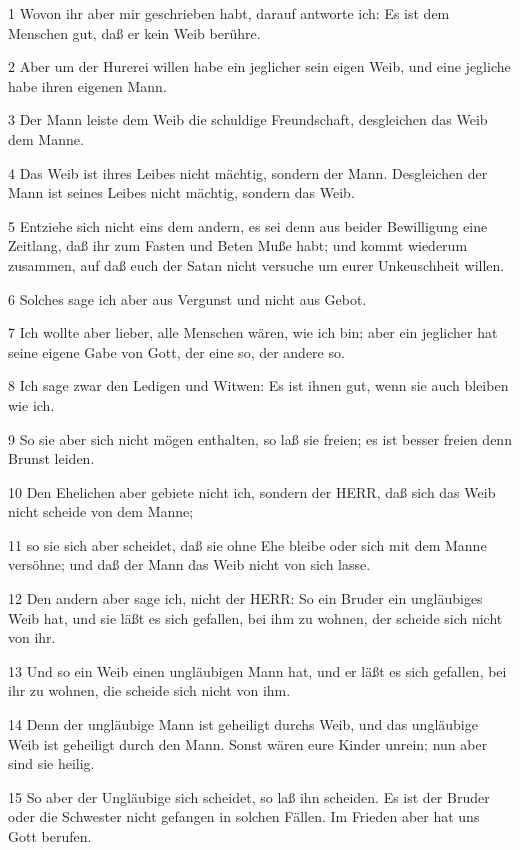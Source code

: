 \par 1 Wovon ihr aber mir geschrieben habt, darauf antworte ich: Es ist dem Menschen gut, daß er kein Weib berühre.
\par 2 Aber um der Hurerei willen habe ein jeglicher sein eigen Weib, und eine jegliche habe ihren eigenen Mann.
\par 3 Der Mann leiste dem Weib die schuldige Freundschaft, desgleichen das Weib dem Manne.
\par 4 Das Weib ist ihres Leibes nicht mächtig, sondern der Mann. Desgleichen der Mann ist seines Leibes nicht mächtig, sondern das Weib.
\par 5 Entziehe sich nicht eins dem andern, es sei denn aus beider Bewilligung eine Zeitlang, daß ihr zum Fasten und Beten Muße habt; und kommt wiederum zusammen, auf daß euch der Satan nicht versuche um eurer Unkeuschheit willen.
\par 6 Solches sage ich aber aus Vergunst und nicht aus Gebot.
\par 7 Ich wollte aber lieber, alle Menschen wären, wie ich bin; aber ein jeglicher hat seine eigene Gabe von Gott, der eine so, der andere so.
\par 8 Ich sage zwar den Ledigen und Witwen: Es ist ihnen gut, wenn sie auch bleiben wie ich.
\par 9 So sie aber sich nicht mögen enthalten, so laß sie freien; es ist besser freien denn Brunst leiden.
\par 10 Den Ehelichen aber gebiete nicht ich, sondern der HERR, daß sich das Weib nicht scheide von dem Manne;
\par 11 so sie sich aber scheidet, daß sie ohne Ehe bleibe oder sich mit dem Manne versöhne; und daß der Mann das Weib nicht von sich lasse.
\par 12 Den andern aber sage ich, nicht der HERR: So ein Bruder ein ungläubiges Weib hat, und sie läßt es sich gefallen, bei ihm zu wohnen, der scheide sich nicht von ihr.
\par 13 Und so ein Weib einen ungläubigen Mann hat, und er läßt es sich gefallen, bei ihr zu wohnen, die scheide sich nicht von ihm.
\par 14 Denn der ungläubige Mann ist geheiligt durchs Weib, und das ungläubige Weib ist geheiligt durch den Mann. Sonst wären eure Kinder unrein; nun aber sind sie heilig.
\par 15 So aber der Ungläubige sich scheidet, so laß ihn scheiden. Es ist der Bruder oder die Schwester nicht gefangen in solchen Fällen. Im Frieden aber hat uns Gott berufen.
